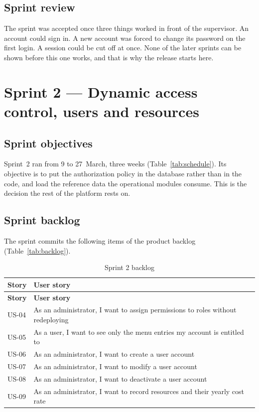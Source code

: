 \subsection{Sprint review}
The sprint was accepted once three things worked in front of the supervisor. An account could sign
in. A new account was forced to change its password on the first login. A session could be cut off
at once. None of the later sprints can be shown before this one works, and that is why the release
starts here.

\section{Sprint 2 --- Dynamic access control, users and resources}

\subsection{Sprint objectives}
Sprint~2 ran from 9 to 27~March, three weeks (Table~\ref{tab:schedule}). Its objective is to put
the authorization policy in the database rather than in the code, and load the reference data the
operational modules consume. This is the decision the rest of the platform rests on.

\subsection{Sprint backlog}
The sprint commits the following items of the product backlog (Table~\ref{tab:backlog}).

\begin{longtable}{|m{1.6cm}|m{12.4cm}|}
\caption{Sprint 2 backlog}\label{tab:sb2}\\
\hline
\textbf{Story} & \textbf{User story} \\
\hline
\endfirsthead
\hline
\textbf{Story} & \textbf{User story} \\
\hline
\endhead
\endfoot
\endlastfoot
\hline
US-04 & As an administrator, I want to assign permissions to roles without redeploying \\
\hline
US-05 & As a user, I want to see only the menu entries my account is entitled to \\
\hline
US-06 & As an administrator, I want to create a user account \\
\hline
US-07 & As an administrator, I want to modify a user account \\
\hline
US-08 & As an administrator, I want to deactivate a user account \\
\hline
US-09 & As an administrator, I want to record resources and their yearly cost rate \\
\hline
\end{longtable}

